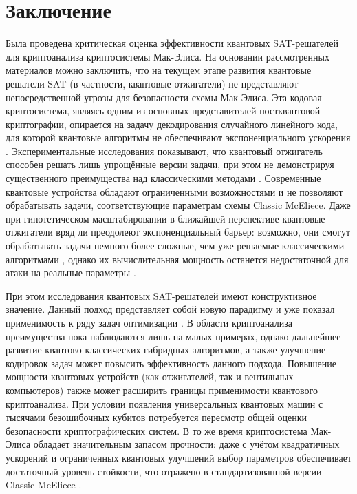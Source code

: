 \section{Заключение}
Была проведена критическая оценка эффективности квантовых SAT-решателей для криптоанализа криптосистемы Мак-Элиса. На основании рассмотренных материалов можно заключить, что на текущем этапе развития квантовые решатели SAT (в частности, квантовые отжигатели) не представляют непосредственной угрозы для безопасности схемы Мак-Элиса. Эта кодовая криптосистема, являясь одним из основных представителей постквантовой криптографии, опирается на задачу декодирования случайного линейного кода, для которой квантовые алгоритмы не обеспечивают экспоненциального ускорения \cite{Grover1996}. Экспериментальные исследования показывают, что квантовый отжигатель способен решать лишь упрощённые версии задачи, при этом не демонстрируя существенного преимущества над классическими методами \cite{Bian2018,Sirdey2023,Pei2025}. Современные квантовые устройства обладают ограниченными возможностями и не позволяют обрабатывать задачи, соответствующие параметрам схемы Classic McEliece. Даже при гипотетическом масштабировании в ближайшей перспективе квантовые отжигатели вряд ли преодолеют экспоненциальный барьер: возможно, они смогут обрабатывать задачи немного более сложные, чем уже решаемые классическими алгоритмами \cite{Shintaro2024}, однако их вычислительная мощность останется недостаточной для атаки на реальные параметры \cite{ClassicMcEliece2020}.

При этом исследования квантовых SAT-решателей имеют конструктивное значение. Данный подход представляет собой новую парадигму и уже показал применимость к ряду задач оптимизации \cite{Bian2018,DWaveDocs}. В области криптоанализа преимущества пока наблюдаются лишь на малых примерах, однако дальнейшее развитие квантово-классических гибридных алгоритмов, а также улучшение кодировок задач может повысить эффективность данного подхода. Повышение мощности квантовых устройств (как отжигателей, так и вентильных компьютеров) также может расширить границы применимости квантового криптоанализа. При условии появления универсальных квантовых машин с тысячами безошибочных кубитов потребуется пересмотр общей оценки безопасности криптографических систем. В то же время криптосистема Мак-Элиса обладает значительным запасом прочности: даже с учётом квадратичных ускорений и ограниченных квантовых улучшений выбор параметров обеспечивает достаточный уровень стойкости, что отражено в стандартизованной версии Classic McEliece \cite{ClassicMcEliece2020}.

